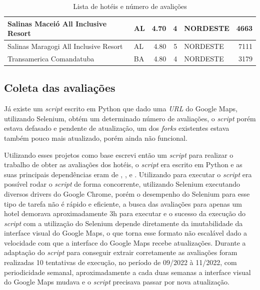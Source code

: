 \begin{table}[]
\begin{tabular}{|p{5cm}|l|r|r|l|r|}
		Salinas Maceió All Inclusive Resort           & AL              & 4.70          & 4                 & NORDESTE        & 4663                \\\hline
		Salinas Maragogi All Inclusive Resort         & AL              & 4.80          & 5                 & NORDESTE        & 7111                \\\hline
		Transamerica Comandatuba                      & BA              & 4.80          & 4                 & NORDESTE        & 3179                \\\hline
	\end{tabular}%
	\caption{Lista de hotéis e número de avalições}
	\label{table:lista_hoteis}
\end{table}

\subsection{Coleta das avaliações}
\label{cap:metodologia:sec:conjunto_dados:sec:coleta}

Já existe um \emph{script} escrito em Python \cite{gaspa93scrapper2023} que dado uma \emph{URL} do Google Maps, utilizando Selenium, obtém um determinado número de avaliações, o \emph{script} porém estava defasado e pendente de atualização, um dos \emph{forks} existentes  estava também pouco mais atualizado, porém ainda não funcional.

Utilizando esses projetos como base escrevi então um \emph{script} para realizar o trabalho de obter as avaliações dos hotéis, o \emph{script} era escrito em Python e as suas principais dependências eram de \cite{selenium2023}, ,  e . Utilizando  para executar o \emph{script} era possível rodar o \emph{script} de forma concorrente, utilizando Selenium executando diversos drivers do Google Chrome, porém o desempenho do Selenium para esse tipo de tarefa não é rápido e eficiente, a busca das avaliações para apenas um hotel demorava aproximadamente 3h para executar e o sucesso da execução do \emph{script} com a utilização do Selenium depende diretamente da imutabilidade da interface visual do Google Maps, o que torna esse formato não escalável dado a velocidade com que a interface do Google Maps recebe atualizações. Durante a adaptação do \emph{script} para conseguir extrair corretamente as avaliações foram realizadas 10 tentativas de execução, no período de 09/2022 à 11/2022, com periodicidade semanal, aproximadamente a cada duas semanas a interface visual do Google Maps mudava e o \emph{script} precisava passar por nova atualização.

